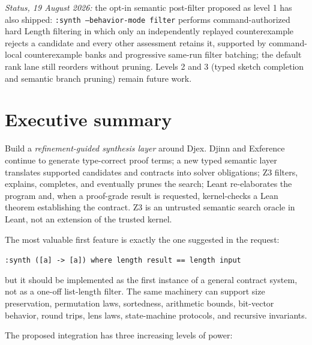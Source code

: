 \documentclass[11pt,oneside]{article}
\newcommand{\code}[1]{\texttt{#1}}
\begin{document}
\begin{titlepage}
{  \emph{Status, 19 August 2026:} the opt-in semantic post-filter proposed as
  level 1 has also shipped: \code{:synth --behavior-mode filter} performs
  command-authorized hard Length filtering in which only an independently
  replayed counterexample rejects a candidate and every other assessment
  retains it, supported by command-local counterexample banks and progressive
  same-run filter batching; the default rank lane still reorders without
  pruning.  Levels 2 and 3 (typed sketch completion and semantic branch
  pruning) remain future work.}
\end{titlepage}

\tableofcontents
\clearpage
{}

\section{Executive summary}

\begin{keybox}[title=Primary recommendation]
Build a \emph{refinement-guided synthesis layer} around Djex. Djinn and Exference
continue to generate type-correct proof terms; a new typed semantic layer translates
supported candidates and contracts into solver obligations; Z3 filters, explains,
completes, and eventually prunes the search; Leant re-elaborates the program and,
when a proof-grade result is requested, kernel-checks a Lean theorem establishing the
contract. Z3 is an untrusted semantic search oracle in Leant, not an extension of the
trusted kernel.
\end{keybox}

The most valuable first feature is exactly the one suggested in the request:

\begin{center}
\code{:synth ([a] -> [a]) where length result == length input}
\end{center}

but it should be implemented as the first instance of a general contract system, not
as a one-off list-length filter. The same machinery can support size preservation,
permutation laws, sortedness, arithmetic bounds, bit-vector behavior, round trips,
lens laws, state-machine protocols, and recursive invariants.

The proposed integration has three increasing levels of power:
\end{document}
